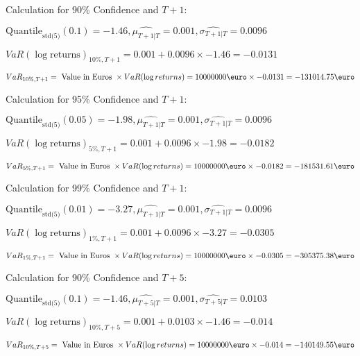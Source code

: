 Calculation for 90\% Confidence and $T+1$:

\indent\indent $\text{Quantile}_\text{std(5)}(0.1) = -1.46,\hat{\mu_{T+1|T}} = 0.001, \hat{\sigma_{T+1|T}} = 0.0096$

\indent\indent $VaR(\log \text{returns})_{10\%, T + 1} = 0.001 + 0.0096\times-1.46 = -0.0131$

\indent\indent $VaR_{10\%, T + 1} = \text{ Value in Euros } \times VaR(\log returns) = 10 000 000 \text{\euro} \times-0.0131 = -131014.75 \text{\euro}$\newline




Calculation for 95\% Confidence and $T+1$:

\indent\indent $\text{Quantile}_\text{std(5)}(0.05) = -1.98,\hat{\mu_{T+1|T}} = 0.001, \hat{\sigma_{T+1|T}} = 0.0096$

\indent\indent $VaR(\log \text{returns})_{5\%, T + 1} = 0.001 + 0.0096\times-1.98 = -0.0182$

\indent\indent $VaR_{5\%, T + 1} = \text{ Value in Euros } \times VaR(\log returns) = 10 000 000 \text{\euro} \times-0.0182 = -181531.61 \text{\euro}$\newline




Calculation for 99\% Confidence and $T+1$:

\indent\indent $\text{Quantile}_\text{std(5)}(0.01) = -3.27,\hat{\mu_{T+1|T}} = 0.001, \hat{\sigma_{T+1|T}} = 0.0096$

\indent\indent $VaR(\log \text{returns})_{1\%, T + 1} = 0.001 + 0.0096\times-3.27 = -0.0305$

\indent\indent $VaR_{1\%, T + 1} = \text{ Value in Euros } \times VaR(\log returns) = 10 000 000 \text{\euro} \times-0.0305 = -305375.38 \text{\euro}$\newline




Calculation for 90\% Confidence and $T+5$:

\indent\indent $\text{Quantile}_\text{std(5)}(0.1) = -1.46,\hat{\mu_{T+5|T}} = 0.001, \hat{\sigma_{T+5|T}} = 0.0103$

\indent\indent $VaR(\log \text{returns})_{10\%, T + 5} = 0.001 + 0.0103\times-1.46 = -0.014$

\indent\indent $VaR_{10\%, T + 5} = \text{ Value in Euros } \times VaR(\log returns) = 10 000 000 \text{\euro} \times-0.014 = -140149.55 \text{\euro}$\newline




